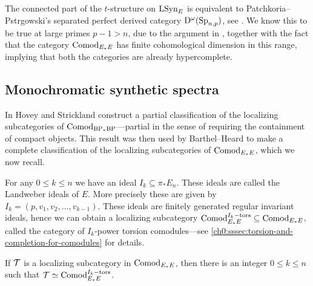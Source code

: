 


\begin{conjecture}
    The connected part of the $t$-structure on $\mathrm{LSyn}_{E}$ is equivalent to Patchkoria--Pstr\a{}gowski's separated perfect derived category $\mathrm{D}^\omega(\mathrm{Sp}_{n,p})$, see \cite[6.49]{patchkoria-pstragowski_2021}. We know this to be true at large primes $p-1>n$, due to the argument in \cite[6.57]{patchkoria-pstragowski_2021}, together with the fact that the category $\mathrm{Comod}_{E_*E}$ has finite cohomological dimension in this range, implying that both the categories are already hypercomplete.
\end{conjecture}




\subsection{Monochromatic synthetic spectra}

In \cite{hovey-strickland_2005a} Hovey and Strickland construct a partial classification of the localizing subcategories of $\mathrm{Comod}_{\mathrm{BP}_*\mathrm{BP}}$---partial in the sense of requiring the containment of compact objects. This result was then used by Barthel--Heard to make a complete classification of the localizing subcategories of $\mathrm{Comod}_{E_*E}$, which we now recall. 

For any $0\leq k\leq n$ we have an ideal $I_k \subseteq \pi_* E_n$. These ideals are called the Landweber ideals of $E$. More precisely these are given by $I_k = (p, v_1, v_2, \ldots, v_{k-1})$. These ideals are finitely generated regular invariant ideals, hence we can obtain a localizing subcategory $\mathrm{Comod}_{E_*E}^{I_k-\mathrm{tors}}\subseteq \mathrm{Comod}_{E_*E}$, called the category of $I_k$-power torsion comodules---see \cref{ch0:sssec:torsion-and-completion-for-comodules} for details. 

\begin{theorem}
    \label{ch3:add:thm:classification-of-abelian-localizing}
    If $\mathcal{T}$ is a localizing subcategory in $\mathrm{Comod}_{E_*E}$, then there is an integer $0\leq k\leq n$ such that $\mathcal{T} \simeq \mathrm{Comod}_{E_*E}^{I_k-\mathrm{tors}}$. 
\end{theorem}

